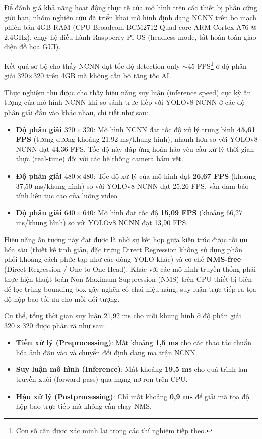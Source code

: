 Để đánh giá khả năng hoạt động thực tế của mô hình trên các thiết bị phần cứng giới hạn, nhóm nghiên cứu đã triển khai mô hình \yolo định dạng NCNN trên bo mạch \rpi phiên bản 4GB RAM (CPU Broadcom BCM2712 Quad-core ARM Cortex-A76 @ 2.4GHz), chạy hệ điều hành Raspberry Pi OS (headless mode, tắt hoàn toàn giao diện đồ họa GUI).

Kết quả sơ bộ cho thấy \yolo NCNN đạt tốc độ detection-only $\sim$45 FPS\footnote{Con số cần được xác minh lại trong các thí nghiệm tiếp theo.} ở độ phân giải 320$\times$320 trên \rpi 4GB mà không cần bộ tăng tốc AI.

Thực nghiệm thu được cho thấy hiệu năng suy luận (inference speed) cực kỳ ấn tượng của mô hình \yolo NCNN khi so sánh trực tiếp với YOLOv8 NCNN ở các độ phân giải đầu vào khác nhau, chi tiết như sau:

\begin{itemize}
    \item \textbf{Độ phân giải $320 \times 320$}: Mô hình \yolo NCNN đạt tốc độ xử lý trung bình \textbf{45,61 FPS} (tương đương khoảng 21,92 ms/khung hình), nhanh hơn so với YOLOv8 NCNN đạt 44,36 FPS. Tốc độ này đáp ứng hoàn hảo yêu cầu xử lý thời gian thực (real-time) đối với các hệ thống camera bám vết.
    \item \textbf{Độ phân giải $480 \times 480$}: Tốc độ xử lý của mô hình đạt \textbf{26,67 FPS} (khoảng 37,50 ms/khung hình) so với YOLOv8 NCNN đạt 25,26 FPS, vẫn đảm bảo tính liên tục cao của luồng video.
    \item \textbf{Độ phân giải $640 \times 640$}: Mô hình đạt tốc độ \textbf{15,09 FPS} (khoảng 66,27 ms/khung hình) so với YOLOv8 NCNN đạt 13,90 FPS.
\end{itemize}

Hiệu năng ấn tượng này đạt được là nhờ sự kết hợp giữa kiến trúc \yolo được tối ưu hóa sâu (thiết kế tinh giản, đặc trưng Direct Regression không sử dụng phân phối khoảng cách phức tạp như các dòng YOLO khác) và cơ chế \textbf{NMS-free} (Direct Regression / One-to-One Head). Khác với các mô hình truyền thống phải thực hiện thuật toán Non-Maximum Suppression (NMS) trên CPU thiết bị biên để lọc trùng bounding box gây nghẽn cổ chai hiệu năng, \yolo suy luận trực tiếp ra tọa độ hộp bao tối ưu cho mỗi đối tượng.

Cụ thể, tổng thời gian suy luận 21,92 ms cho mỗi khung hình ở độ phân giải $320 \times 320$ được phân rã như sau:
\begin{itemize}
    \item \textbf{Tiền xử lý (Preprocessing)}: Mất khoảng \textbf{1,5 ms} cho các thao tác chuẩn hóa ảnh đầu vào và chuyển đổi định dạng ma trận NCNN.
    \item \textbf{Suy luận mô hình (Inference)}: Mất khoảng \textbf{19,5 ms} cho quá trình lan truyền xuôi (forward pass) qua mạng nơ-ron trên CPU.
    \item \textbf{Hậu xử lý (Postprocessing)}: Chỉ mất khoảng \textbf{0,9 ms} để giải mã tọa độ hộp bao trực tiếp mà không cần chạy NMS.
\end{itemize}

